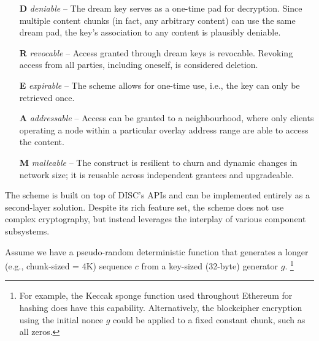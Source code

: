 \begin{itemize}
    \item[\textbf{D}] \emph{deniable} -- The dream key serves as a one-time pad for decryption. Since multiple content chunks (in fact, any arbitrary content) can use the same dream pad, the key's association to any content is plausibly deniable.
    \item[\textbf{R}] \emph{revocable} -- Access granted through dream keys is revocable. Revoking access from all parties, including oneself, is considered deletion.   
    \item[\textbf{E}] \emph{expirable} -- The scheme allows for one-time use, i.e., the key can only be retrieved once.
    \item[\textbf{A}] \emph{addressable} -- Access can be granted to a neighbourhood, where only clients operating a node within a particular overlay address range are able to access the content.
    \item[\textbf{M}] \emph{malleable}  --  The construct is resilient to churn and dynamic changes in network size; it is reusable across independent grantees and upgradeable.
\end{itemize}

The scheme is built on top of DISC's APIs and can be implemented entirely as a second-layer solution.  Despite its rich feature set, the scheme does not use complex cryptography, but instead leverages the interplay of various component subsystems.




Assume we have a pseudo-random deterministic function that generates a longer (e.g., chunk-sized = 4K) sequence $c$ from a key-sized (32-byte) generator $g$.%
%
\footnote{For example, the Keccak sponge function used throughout Ethereum for hashing does have this capability. Alternatively, the blockcipher encryption using the initial nonce $g$ could be applied to a fixed constant chunk, such as all zeros.}

